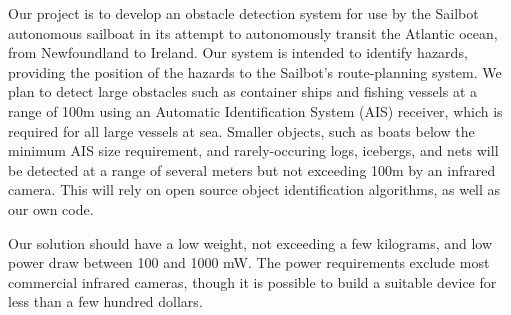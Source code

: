 Our project is to develop an obstacle detection system for use by the Sailbot autonomous sailboat in its attempt to autonomously transit the Atlantic ocean, from Newfoundland to Ireland. Our system is intended to identify hazards, providing the position of the hazards to the Sailbot's route-planning system. We plan to detect large obstacles such as container ships and fishing vessels at a range of 100m using an Automatic Identification System (AIS) receiver, which is required for all large vessels at sea. Smaller objects, such as boats below the minimum AIS size requirement, and rarely-occuring logs, icebergs, and nets will be detected at a range of several meters but not exceeding 100m by an infrared camera. This will rely on open source object identification algorithms, as well as our own code.

Our solution should have a low weight, not exceeding a few kilograms, and low power draw between 100 and 1000 mW. The power requirements exclude most commercial infrared cameras, though it is possible to build a suitable device for less than a few hundred dollars.
